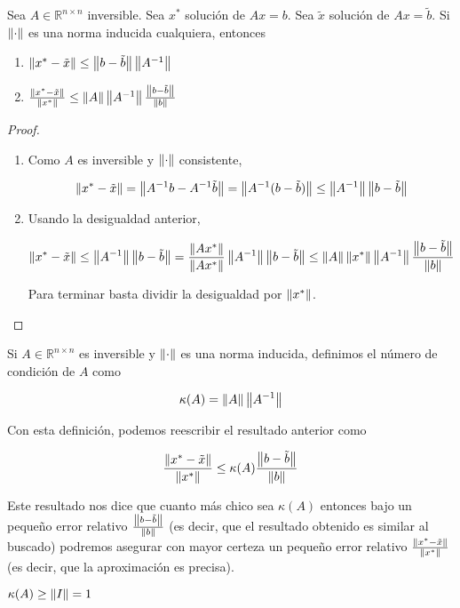 \begin{propo}
Sea $A \in \mathbb{R}^{n \times n}$ inversible. Sea $x^*$ solución de $Ax = b$. Sea $\tilde{x}$ solución de $Ax = \tilde{b}$. Si $\left\lVert\cdot\right\rVert$ es una norma inducida cualquiera, entonces
\begin{enumerate}
\item $\left\lVert x^* - \tilde{x}\right\rVert \leq \left\lVert b - \tilde{b}\right\rVert \left\lVert A^{-1}\right\rVert$
\item $\frac{\left\lVert x^* - \tilde{x}\right\rVert}{\left\lVert x^*\right\rVert} \leq \left\lVert A\right\rVert \left\lVert A^{-1}\right\rVert \frac{\left\lVert b - \tilde{b}\right\rVert}{\left\lVert b\right\rVert}$
\end{enumerate}

\begin{proof}
\begin{enumerate}
\item Como $A$ es inversible y $\left\lVert\cdot\right\rVert$ consistente,

\[\left\lVert x^* - \tilde{x}\right\rVert = \left\lVert A^{-1}b - A^{-1}\tilde{b}\right\rVert = \left\lVert A^{-1}(b - \tilde{b})\right\rVert \leq \left\lVert A^{-1}\right\rVert \left\lVert b - \tilde{b}\right\rVert\]

\item Usando la desigualdad anterior,

\[\left\lVert x^* - \tilde{x}\right\rVert \leq \left\lVert A^{-1}\right\rVert \left\lVert b - \tilde{b}\right\rVert = \frac{\left\lVert Ax^*\right\rVert}{\left\lVert Ax^*\right\rVert} \left\lVert A^{-1}\right\rVert \left\lVert b - \tilde{b}\right\rVert \leq \left\lVert A\right\rVert \left\lVert x^*\right\rVert \left\lVert A^{-1}\right\rVert \frac{\left\lVert b - \tilde{b}\right\rVert}{\left\lVert b\right\rVert}\]

Para terminar basta dividir la desigualdad por $\left\lVert x^*\right\rVert$.

\end{enumerate}

\end{proof}

\end{propo}

\begin{defi}
Si $A\in \mathbb{R}^{n \times n}$ es inversible y $\left\lVert\cdot\right\rVert$ es una norma inducida, definimos el número de condición de $A$ como

\[\kappa(A) = \left\lVert A\right\rVert\left\lVert A^{-1}\right\rVert\]
\end{defi}

Con esta definición, podemos reescribir el resultado anterior como

\begin{coro}
\[\frac{\left\lVert x^* - \tilde{x}\right\rVert}{\left\lVert x^*\right\rVert} \leq \kappa(A) \frac{\left\lVert b - \tilde{b}\right\rVert}{\left\lVert b\right\rVert}\]
\end{coro}

Este resultado nos dice que cuanto más chico sea $\kappa(A)$ entonces bajo un pequeño error relativo $\frac{\left\lVert b - \tilde{b}\right\rVert}{\left\lVert b\right\rVert}$ (es decir, que el resultado obtenido es similar al buscado) podremos asegurar con mayor certeza un pequeño error relativo $\frac{\left\lVert x^* - \tilde{x}\right\rVert}{\left\lVert x^*\right\rVert}$ (es decir, que la aproximación es precisa).

\begin{obs}
$\kappa(A) \geq \left\lVert I\right\rVert = 1$
\end{obs}